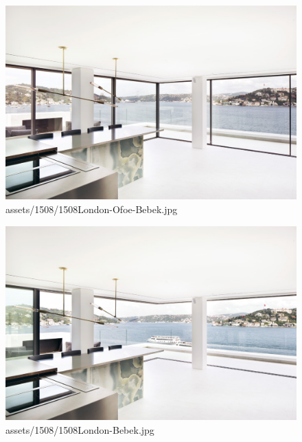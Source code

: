 \documentclass[
]{article}
\begin{document}
\begin{figure}[H]

{\centering \includegraphics{assets/1508/1508London-Ofoe-Bebek.jpg}

}

\caption{assets/1508/1508London-Ofoe-Bebek.jpg}

\end{figure}%
\begin{figure}[H]

{\centering \includegraphics{assets/1508/1508London-Bebek.jpg}

}

\caption{assets/1508/1508London-Bebek.jpg}

\end{figure}%
\end{document}
